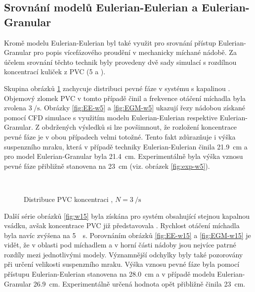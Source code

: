 \subsection{Srovnání modelů Eulerian-Eulerian a Eulerian-Granular}
Kromě modelu Eulerian-Eulerian byl také využit pro srovnání přístup Eulerian-Granular pro popis vícefázového proudění v mechanicky míchané nádobě. Za účelem srovnání těchto technik byly provedeny dvě sady simulací s rozdílnou koncentrací kuliček z PVC (5 a ).

Skupina obrázků \ref{fig:w5} zachycuje distribuci pevné fáze v systému s kapalinou \pvpS{}. Objemový zlomek PVC v tomto případě činil  a frekvence otáčení míchadla byla zvolena $\SI{3}{\per\second}$. Obrázky \ref{fig:EE-w5} a \ref{fig:EGM-w5} ukazují řezy nádobou získané pomocí CFD simulace s využitím modelu Eulerian-Eulerian respektive Eulerian-Granular. Z obdržených výsledků si lze povšimnout, že rozložení koncentrace pevné fáze je v obou případech velmi totožné. Tento fakt zdůrazňuje i výška suspenzního mraku, která v případě techniky Eulerian-Eulerian činila \SI{21.9}{\centi\meter} a pro model Eulerian-Granular byla \SI{21.4}{\centi\meter}. Experimentálně byla výška vznosu pevné fáze přibližně stanovena na \SI{23}{\centi\meter} (viz. obrázek \ref{fig:exp-w5}).

\begin{figure}[h!]
 \centering
  \qquad 
  \\
  \caption{Distribuce PVC koncentraci , $N=\SI{3}{\per\second}$}
  \label{fig:w5}
\end{figure}
Další série obrázků \ref{fig:w15} byla získána pro systém obsahující stejnou kapalnou vsádku, avšak koncentrace PVC již představovala . Rychlost otáčení míchadla byla navíc zvýšena na \SI{5}{\per\second}. Porovnáním obrázků \ref{fig:EE-w15} a \ref{fig:EGM-w15} je vidět, že v oblasti pod míchadlem a v horní části nádoby jsou nejvíce patrné rozdíly mezi jednotlivými modely. Významnější odchylky byly také pozorovány při určení velikosti suspenzního mraku. Výška vznosu pevné fáze byla pomocí přístupu Eulerian-Eulerian stanovena na \SI{28.0}{\centi\meter} a v případě modelu Eulerian-Granular \SI{26.9}{\centi\meter}. Experimentálně určená hodnota opět přibližně činila \SI{23}{\centi\meter}. 

